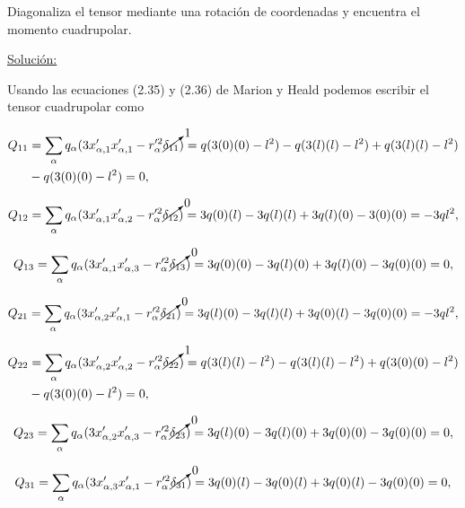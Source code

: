 \documentclass[a4paper,11pt]{article}
\numberwithin{equation}{section}
\begin{document}
Diagonaliza el tensor mediante una rotación de coordenadas y encuentra el momento
cuadrupolar.

\vspace{.3cm}

\underline{Solución:} \vspace{.3cm}

Usando las ecuaciones (2.35) y (2.36) de Marion y Heald \cite{marion2} podemos 
escribir el tensor cuadrupolar como 

\begin{align*}
 Q_{11} &= \sum_\alpha q_\alpha(3x'_{\alpha,1}x'_{\alpha,1} -
 r'^2_\alpha\cancelto{1}{\delta_{11}}) 
 = q(3(0)(0) - l^2) - q(3(l)(l) - l^2) + q(3(l)(l) - l^2) \\ 
 &- q(3(0)(0) - l^2) = 0,
\end{align*}

\begin{equation*}
 Q_{12} = \sum_\alpha q_\alpha(3x'_{\alpha,1}x'_{\alpha,2} - 
 r'^2_\alpha\cancelto{0}{\delta_{12}}) = 3q(0)(l) - 3q(l)(l) 
 + 3q(l)(0) - 3(0)(0) = -3ql^2,
\end{equation*}

\begin{equation*}
 Q_{13} = \sum_\alpha q_\alpha(3x'_{\alpha,1}x'_{\alpha,3} - 
 r'^2_\alpha\cancelto{0}{\delta_{13}}) = 3q(0)(0) - 3q(l)(0) 
 + 3q(l)(0) - 3q(0)(0) = 0,
\end{equation*}

\begin{equation*}
 Q_{21} = \sum_\alpha q_\alpha(3x'_{\alpha,2}x'_{\alpha,1} - 
 r'^2_\alpha\cancelto{0}{\delta_{21}}) = 3q(l)(0) - 3q(l)(l) 
 + 3q(0)(l) - 3q(0)(0) = -3ql^2,
\end{equation*}

\begin{align*}
 Q_{22} &= \sum_\alpha q_\alpha(3x'_{\alpha,2}x'_{\alpha,2} -
 r'^2_\alpha\cancelto{1}{\delta_{22}}) 
 = q(3(l)(l) - l^2) - q(3(l)(l) - l^2) + q(3(0)(0) - l^2) \\ 
 &- q(3(0)(0) - l^2) = 0,
\end{align*}

\begin{equation*}
 Q_{23} = \sum_\alpha q_\alpha(3x'_{\alpha,2}x'_{\alpha,3} - 
 r'^2_\alpha\cancelto{0}{\delta_{23}}) = 3q(l)(0) - 3q(l)(0) 
 + 3q(0)(0) - 3q(0)(0) = 0,
\end{equation*}

\begin{equation*}
 Q_{31} = \sum_\alpha q_\alpha(3x'_{\alpha,3}x'_{\alpha,1} - 
 r'^2_\alpha\cancelto{0}{\delta_{31}}) = 3q(0)(l) - 3q(0)(l) 
 + 3q(0)(l) - 3q(0)(0) = 0,
\end{equation*}
\end{document}
